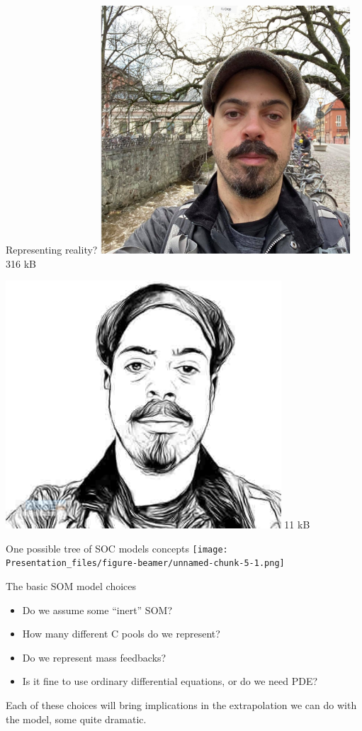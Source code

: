 \documentclass[
  ignorenonframetext,
]{beamer}
\providecommand{\tightlist}{%
  \setlength{\itemsep}{0pt}\setlength{\parskip}{0pt}}
\begin{document}
\begin{frame}{Representing reality?}
\protect\hypertarget{representing-reality}{}
\includegraphics[width=\textwidth,height=3.64583in]{me.jpg} 316 kB

\includegraphics[width=\textwidth,height=3.64583in]{me_model.jpg} 11 kB
\end{frame}

\begin{frame}{One possible tree of SOC models concepts}
\protect\hypertarget{one-possible-tree-of-soc-models-concepts}{}
\texttt{[image: Presentation\_files/figure-beamer/unnamed-chunk-5-1.png]}
\end{frame}

\begin{frame}{The basic SOM model choices}
\protect\hypertarget{the-basic-som-model-choices}{}
\begin{itemize}
\tightlist
\item
  Do we assume some ``inert'' SOM?
\item
  How many different C pools do we represent?
\item
  Do we represent mass feedbacks?
\item
  Is it fine to use ordinary differential equations, or do we need PDE?
\end{itemize}

Each of these choices will bring implications in the extrapolation we
can do with the model, some quite dramatic.
\end{frame}
\end{document}
